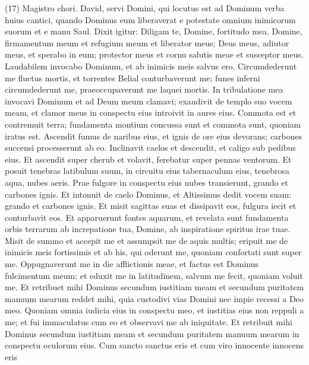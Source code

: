 \begin{biblechapter}  (17) 
\verse  Magistro chori. David, servi Domini, qui locutus est ad Dominum verba huius cantici, quando Dominus eum liberaverat e potestate omnium inimicorum suorum 
\verse et e manu Saul. Dixit igitur: Diligam te, Domine, fortitudo mea. 
\verse Domine, firmamentum meum et refugium meum et liberator meus; Deus meus, adiutor meus, et sperabo in eum; protector meus et cornu salutis meae et susceptor meus. 
\verse Laudabilem invocabo Dominum, et ab inimicis meis salvus ero. 
\verse Circumdederunt me fluctus mortis, et torrentes Belial conturbaverunt me; 
\verse funes inferni circumdederunt me, praeoccupaverunt me laquei mortis. 
\verse In tribulatione mea invocavi Dominum et ad Deum meum clamavi; exaudivit de templo suo vocem meam, et clamor meus in conspectu eius introivit in aures eius. 
\verse Commota est et contremuit terra; fundamenta montium concussa sunt et commota sunt, quoniam iratus est. 
\verse Ascendit fumus de naribus eius, et ignis de ore eius devorans; carbones succensi processerunt ab eo. 
\verse Inclinavit caelos et descendit, et caligo sub pedibus eius. 
\verse Et ascendit super cherub et volavit, ferebatur super pennas ventorum. 
\verse Et posuit tenebras latibulum suum, in circuitu eius tabernaculum eius, tenebrosa aqua, nubes aeris. 
\verse Prae fulgore in conspectu eius nubes transierunt, grando et carbones ignis. 
\verse Et intonuit de caelo Dominus, et Altissimus dedit vocem suam: grando et carbones ignis. 
\verse Et misit sagittas suas et dissipavit eos, fulgura iecit et conturbavit eos. 
\verse Et apparuerunt fontes aquarum, et revelata sunt fundamenta orbis terrarum ab increpatione tua, Domine, ab inspiratione spiritus irae tuae. 
\verse Misit de summo et accepit me et assumpsit me de aquis multis; 
\verse eripuit me de inimicis meis fortissimis et ab his, qui oderunt me, quoniam confortati sunt super me. 
\verse Oppugnaverunt me in die afflictionis meae, et factus est Dominus fulcimentum meum; 
\verse et eduxit me in latitudinem, salvum me fecit, quoniam voluit me. 
\verse Et retribuet mihi Dominus secundum iustitiam meam et secundum puritatem manuum mearum reddet mihi, 
\verse quia custodivi vias Domini nec impie recessi a Deo meo. 
\verse Quoniam omnia iudicia eius in conspectu meo, et iustitias eius non reppuli a me; 
\verse et fui immaculatus cum eo et observavi me ab iniquitate. 
\verse Et retribuit mihi Dominus secundum iustitiam meam et secundum puritatem manuum mearum in conspectu oculorum eius. 
\verse Cum sancto sanctus eris et cum viro innocente innocens eris 

\end{biblechapter}
